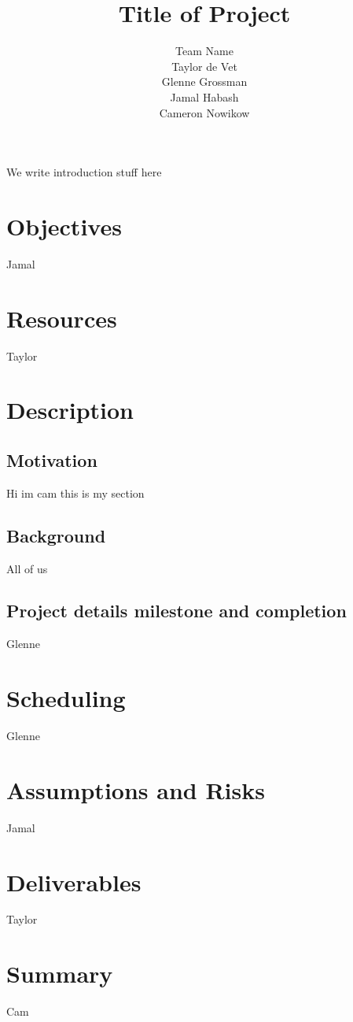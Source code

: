 \documentclass{article}
\title{Title of Project}
\author{Team Name
		\\ Taylor de Vet
    \\ Glenne Grossman
		\\ Jamal Habash
		\\ Cameron Nowikow
}
\date{}
\begin{document}
\newpage

\maketitle

We write introduction stuff here

\section{Objectives}
Jamal

\section{Resources}
Taylor


\section{Description}

\subsection{Motivation}
Hi im cam this is my section
\subsection{Background}
All of us
\subsection{Project details milestone and completion}
Glenne
\section{Scheduling}
Glenne
\section{Assumptions and Risks}
Jamal
\section{Deliverables}
Taylor
\section{Summary}
Cam
\end{document}
